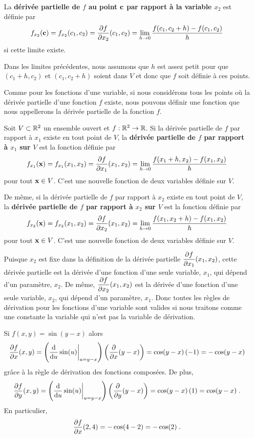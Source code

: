{\begin{defn}
La {\bfseries dérivée partielle de $f$ au point $\VEC{c}$ par rapport à la
variable $x_2$} est définie par
\[
f_{x_2}(\VEC{c}) = f_{x_2}(c_1,c_2) 
= \pdydx{f}{x_2}(c_1,c_2)
= \lim_{h\rightarrow 0}\frac{f(c_1,c_2+h)-f(c_1,c_2)}{h}
\]
si cette limite existe.

Dans les limites précédentes, nous assumons que $h$ est assez petit pour que
$(c_1+h,c_2)$ et $(c_1,c_2+h)$ soient dans $V$ et donc que $f$ soit définie à
ces points.
\end{defn}

Comme pour les fonctions d'une variable, si nous considérons tous les points où
la dérivée partielle d'une fonction $f$ existe, nous pouvons définir
une fonction que nous appellerons la dérivée partielle de la fonction $f$.

\begin{defn} 
Soit $V\subset \RR^2$ un ensemble ouvert et $f:\RR^2 \rightarrow \RR$.  Si
la dérivée partielle de $f$ par rapport à $x_1$ existe en tout point de $V$,
la {\bfseries dérivée partielle de $f$ par rapport à $x_1$ sur $V$} est la
fonction définie par
\[
f_{x_1}(\VEC{x}) = f_{x_1}(x_1,x_2) 
= \pdydx{f}{x_1}(x_1,x_2)
= \lim_{h\rightarrow 0}\frac{f(x_1+h,x_2)-f(x_1,x_2)}{h}
\]
pour tout $\VEC{x}\in V$.  C'est une nouvelle fonction de deux variables
définie sur $V$.

De même, si la dérivée partielle de $f$ par rapport à $x_2$ existe en tout
point de $V$, la {\bfseries dérivée partielle de $f$ par rapport à $x_2$ sur
$V$} est la fonction définie par
\[
f_{x_2}(\VEC{x}) = f_{x_2}(x_1,x_2) 
= \pdydx{f}{x_2}(x_1,x_2)
= \lim_{h\rightarrow 0}\frac{f(x_1,x_2+h)-f(x_1,x_2)}{h}
\]
pour tout $\VEC{x}\in V$.  C'est une nouvelle fonction de deux variables
définie sur $V$.
\end{defn}

Puisque $x_2$ est fixe dans la définition de la dérivée partielle
$\DS \pdydx{f}{x_1}(x_1,x_2)$, cette dérivée partielle est la
dérivée d'une fonction d'une seule variable, $x_1$, qui dépend d'un
paramètre, $x_2$.  De même, $\DS \pdydx{f}{x_2}(x_1,x_2)$ est
la dérivée d'une fonction d'une seule variable, $x_2$, qui dépend d'un
paramètre, $x_1$.  Donc toutes les règles de dérivation pour les
fonctions d'une variable sont valides si nous traitons comme une constante
la variable qui n'est pas la variable de dérivation.

\begin{egg}
Si $f(x,y) = \sin(y-x)$ alors
\[
\pdydx{f}{x}(x,y) =
\left(\dfdx{\sin(u)}{u}\bigg|_{u=y-x}\right)
\left(\pdfdx{(y-x)}{x} \right)
= \cos(y-x)\,(-1) = -\cos(y-x)
\]
grâce à la règle de dérivation des fonctions composées. De plus,
\[
\pdydx{f}{y}(x,y) =
\left(\dfdx{\sin(u)}{u}\bigg|_{u=y-x}\right)
\left(\pdfdx{(y-x)}{y} \right)
= \cos(y-x)\,(1) = \cos(y-x) \; .
\]
En particulier,
\[
\pdydx{f}{x}(2,4) = -\cos(4-2) = -\cos(2) \; .
\]
\end{egg}

}
